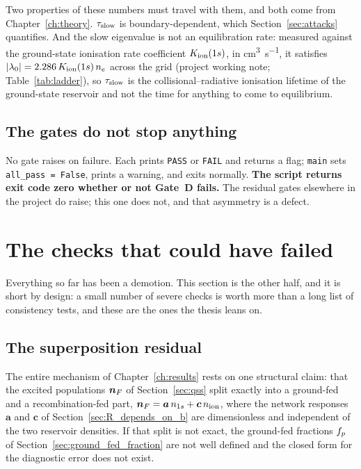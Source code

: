 Two properties of these numbers must travel with them, and both come from
Chapter~\ref{ch:theory}. $\tau_{\mathrm{slow}}$ is boundary-dependent, which
Section~\ref{sec:attacks} quantifies. And the slow eigenvalue is not an
equilibration rate: measured against the ground-state ionisation rate
coefficient $K_{\rm ion}(1s)$, in \si{\cubic\centi\metre\per\second}, it
satisfies $|\lambda_0| = 2.286\,K_{\rm ion}(1s)\,n_e$ across the grid
(project working note; Table~\ref{tab:ladder}), so $\tau_{\mathrm{slow}}$ is the collisional--radiative
ionisation lifetime of the ground-state reservoir and not the time for anything
to come to equilibrium.

\subsection{The gates do not stop anything}

No gate raises on failure. Each prints \texttt{PASS} or \texttt{FAIL} and
returns a flag; \texttt{main} sets \texttt{all\_pass = False}, prints a warning,
and exits normally. \textbf{The script returns exit code zero whether or not
Gate~D fails.} The residual gates elsewhere in the project do raise; this one
does not, and that asymmetry is a defect.

\section{The checks that could have failed}
\label{sec:severe_checks}

Everything so far has been a demotion. This section is the other half, and it
is short by design: a small number of severe checks is worth more than a long
list of consistency tests, and these are the ones the thesis leans on.

\subsection{The superposition residual}
\label{sec:superposition}

The entire mechanism of Chapter~\ref{ch:results} rests on one structural claim:
that the excited populations $\bm{n}_{F}$ of Section~\ref{sec:qss} split exactly into a
ground-fed and a recombination-fed part,
$\bm{n}_{F} = \bm{a}\,n_{1s} + \bm{c}\,n_{\mathrm{ion}}$, where the network responses $\bm{a}$ and
$\bm{c}$ of Section~\ref{sec:R_depends_on_b} are dimensionless and independent
of the two reservoir densities. If that split is not exact, the ground-fed
fractions $f_{p}$ of Section~\ref{sec:ground_fed_fraction} are not well
defined and the closed form for the diagnostic error does not exist.


